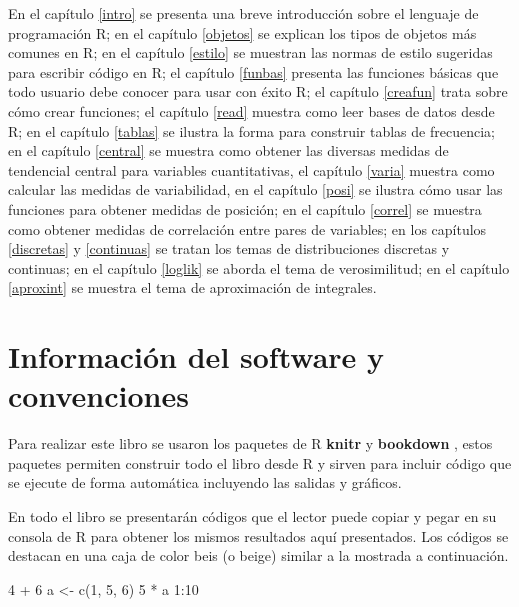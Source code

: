 \documentclass[
]{book}
\makeatletter
\newenvironment{Shaded}{\begin{snugshade}}{\end{snugshade}}
\newcommand{\DecValTok}[1]{\textcolor[rgb]{0.00,0.00,0.81}{#1}}
\newcommand{\FunctionTok}[1]{\textcolor[rgb]{0.00,0.00,0.00}{#1}}
\newcommand{\NormalTok}[1]{#1}
\newcommand{\OtherTok}[1]{\textcolor[rgb]{0.56,0.35,0.01}{#1}}
\newcommand{\SpecialCharTok}[1]{\textcolor[rgb]{0.00,0.00,0.00}{#1}}
\newenvironment{kframe}{%
\medskip{}
\setlength{\fboxsep}{.8em}
 \def\at@end@of@kframe{}%
 \ifinner\ifhmode%
  \def\at@end@of@kframe{\end{minipage}}%
  \begin{minipage}{\columnwidth}%
 \fi\fi%
 \def\FrameCommand##1{\hskip\@totalleftmargin \hskip-\fboxsep
 \colorbox{shadecolor}{##1}\hskip-\fboxsep
     \hskip-\linewidth \hskip-\@totalleftmargin \hskip\columnwidth}%
 \MakeFramed {\advance\hsize-\width
   \@totalleftmargin\z@ \linewidth\hsize
   \@setminipage}}%
 {\par\unskip\endMakeFramed%
 \at@end@of@kframe}
\renewenvironment{Shaded}{\begin{kframe}}{\end{kframe}}
\makeatother
\begin{document}
En el capítulo \ref{intro} se presenta una breve introducción sobre el lenguaje de programación R; en el capítulo \ref{objetos} se explican los tipos de objetos más comunes en R; en el capítulo \ref{estilo} se muestran las normas de estilo sugeridas para escribir código en R; el capítulo \ref{funbas} presenta las funciones básicas que todo usuario debe conocer para usar con éxito R; el capítulo \ref{creafun} trata sobre cómo crear funciones; el capítulo \ref{read} muestra como leer bases de datos desde R; en el capítulo \ref{tablas} se ilustra la forma para construir tablas de frecuencia; en el capítulo \ref{central} se muestra como obtener las diversas medidas de tendencial central para variables cuantitativas, el capítulo \ref{varia} muestra como calcular las medidas de variabilidad, en el capítulo \ref{posi} se ilustra cómo usar las funciones para obtener medidas de posición; en el capítulo \ref{correl} se muestra como obtener medidas de correlación entre pares de variables; en los capítulos \ref{discretas} y \ref{continuas} se tratan los temas de distribuciones discretas y continuas; en el capítulo \ref{loglik} se aborda el tema de verosimilitud; en el capítulo \ref{aproxint} se muestra el tema de aproximación de integrales.

\hypertarget{informaciuxf3n-del-software-y-convenciones}{%
\section*{Información del software y convenciones}\label{informaciuxf3n-del-software-y-convenciones}}

Para realizar este libro se usaron los paquetes de R \textbf{knitr} \citep{xie2015} y \textbf{bookdown} \citep{R-bookdown}, estos paquetes permiten construir todo el libro desde R y sirven para incluir código que se ejecute de forma automática incluyendo las salidas y gráficos.

En todo el libro se presentarán códigos que el lector puede copiar y pegar en su consola de R para obtener los mismos resultados aquí presentados. Los códigos se destacan en una caja de color beis (o beige) similar a la mostrada a continuación.

\begin{Shaded}
\begin{Highlighting}[]
\DecValTok{4} \SpecialCharTok{+} \DecValTok{6}
\NormalTok{a }\OtherTok{\textless{}{-}} \FunctionTok{c}\NormalTok{(}\DecValTok{1}\NormalTok{, }\DecValTok{5}\NormalTok{, }\DecValTok{6}\NormalTok{)}
\DecValTok{5} \SpecialCharTok{*}\NormalTok{ a}
\DecValTok{1}\SpecialCharTok{:}\DecValTok{10}
\end{Highlighting}
\end{Shaded}
\end{document}
